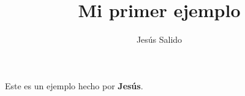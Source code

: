 \documentclass[11pt,a4paper]{article}
\author{Jesús Salido}
\title{Mi primer ejemplo}
\begin{document}
\maketitle

Este es un ejemplo hecho por \textbf{Jesús}.
\end{document}

